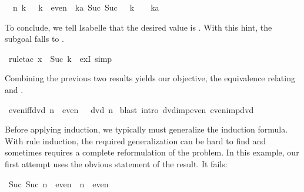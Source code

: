 \begin{isabellebody}
\begin{isamarkuptxt}%
\begin{isabelle}%
\ {}{\isachardot}\ {\isasymAnd}n\ k{\isachardot}\ {}\ {\isacharasterisk}\ k\ {\isasymin}\ even\ {\isasymLongrightarrow}\ {\isasymexists}ka{\isachardot}\ Suc\ {\isacharparenleft}Suc\ {\isacharparenleft}{}\ {\isacharasterisk}\ k{\isacharparenright}{\isacharparenright}\ {\isacharequal}\ {}\ {\isacharasterisk}\ ka%
\end{isabelle}
To conclude, we tell Isabelle that the desired value is
.  With this hint, the subgoal falls to .%
\end{isamarkuptxt}%
\isamarkuptrue%
\isamarkupfalse%
\ {\isacharparenleft}rule{\isacharunderscore}tac\ x\ {\isacharequal}\ {\isachardoublequoteopen}Suc\ k{\isachardoublequoteclose}\ \ exI{\isacharcomma}\ simp{\isacharparenright}%
\endisatagproof
{\isafoldproof}%
%
\isadelimproof
%
\endisadelimproof
%
\begin{isamarkuptext}%
Combining the previous two results yields our objective, the
equivalence relating  and . 
%
\end{isamarkuptext}%
\isamarkuptrue%
\isamarkupfalse%
\ even{\isacharunderscore}iff{\isacharunderscore}dvd{\isacharcolon}\ {\isachardoublequoteopen}{\isacharparenleft}n\ {\isasymin}\ even{\isacharparenright}\ {\isacharequal}\ {\isacharparenleft}{}\ dvd\ n{\isacharparenright}{\isachardoublequoteclose}\isanewline
%
\isadelimproof
%
\endisadelimproof
%
\isatagproof
{}\isamarkupfalse%
\ {\isacharparenleft}blast\ intro{\isacharcolon}\ dvd{\isacharunderscore}imp{\isacharunderscore}even\ even{\isacharunderscore}imp{\isacharunderscore}dvd{\isacharparenright}%
\endisatagproof
{\isafoldproof}%
%
\isadelimproof
%
\endisadelimproof
%
\isamarkuptrue%
%
\begin{isamarkuptext}%
%
Before applying induction, we typically must generalize
the induction formula.  With rule induction, the required generalization
can be hard to find and sometimes requires a complete reformulation of the
problem.  In this  example, our first attempt uses the obvious statement of
the result.  It fails:%
\end{isamarkuptext}%
\isamarkuptrue%
\isamarkupfalse%
\ {\isachardoublequoteopen}Suc\ {\isacharparenleft}Suc\ n{\isacharparenright}\ {\isasymin}\ even\ {\isasymLongrightarrow}\ n\ {\isasymin}\ even{\isachardoublequoteclose}\isanewline

\end{isabellebody}
